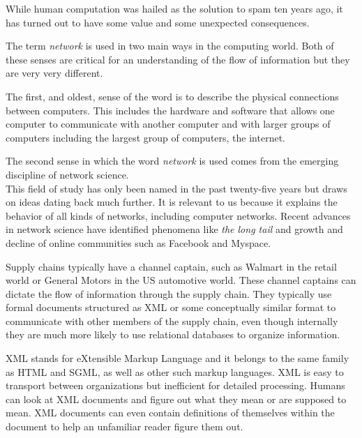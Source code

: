 While human computation was hailed as the solution to spam ten years
ago, it has turned out to have some value and some unexpected
consequences.

\hypertarget{networked-information}{%
\label{networked-information}}

The term \emph{network} is used in two main ways in the computing world.
Both of these senses are critical for an understanding of the flow of
information but they are very very different.

The first, and oldest, sense of the word is to describe the physical
connections between computers. This includes the hardware and software
that allows one computer to communicate with another computer and with
larger groups of computers including the largest group of computers, the
internet.

The second sense in which the word \emph{network} is used comes from the
emerging discipline of network science.\\
This field of study has only been named in the past twenty-five years
but draws on ideas dating back much further. It is relevant to us
because it explains the behavior of all kinds of networks, including
computer networks. Recent advances in network science have identified
phenomena like \emph{the long tail} and growth and decline of online
communities such as Facebook and Myspace.

\hypertarget{supply-chain-information}{%
\label{supply-chain-information}}

Supply chains typically have a channel captain, such as Walmart in the
retail world or General Motors in the US automotive world. These channel
captains can dictate the flow of information through the supply chain.
They typically use formal documents structured as XML or some
conceptually similar format to communicate with other members of the
supply chain, even though internally they are much more likely to use
relational databases to organize information.

XML stands for eXtensible Markup Language and it belongs to the same
family as HTML and SGML, as well as other such markup languages. XML is
easy to transport between organizations but inefficient for detailed
processing. Humans can look at XML documents and figure out what they
mean or are supposed to mean. XML documents can even contain definitions
of themselves within the document to help an unfamiliar reader figure
them out.


